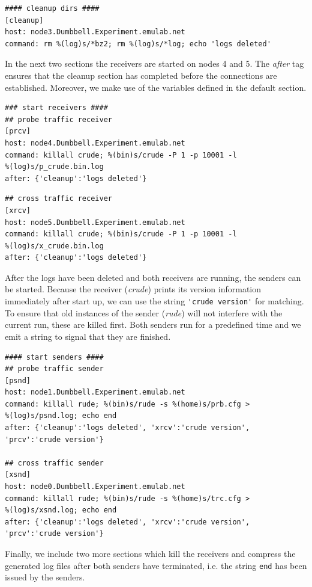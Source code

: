 \begin{Verbatim}[fontsize=\footnotesize]
#### cleanup dirs ####
[cleanup]
host: node3.Dumbbell.Experiment.emulab.net
command: rm %(log)s/*bz2; rm %(log)s/*log; echo 'logs deleted'
\end{Verbatim}

In the next two sections the receivers are started on nodes 4 and
5. The \emph{after} tag ensures that the cleanup section has completed
before the connections are established. Moreover, we make use of the
variables defined in the default section.

\begin{Verbatim}[fontsize=\footnotesize]
### start receivers ####
## probe traffic receiver
[prcv]
host: node4.Dumbbell.Experiment.emulab.net
command: killall crude; %(bin)s/crude -P 1 -p 10001 -l
%(log)s/p_crude.bin.log
after: {'cleanup':'logs deleted'}
\end{Verbatim}

\begin{Verbatim}[fontsize=\footnotesize]
## cross traffic receiver
[xrcv]
host: node5.Dumbbell.Experiment.emulab.net
command: killall crude; %(bin)s/crude -P 1 -p 10001 -l
%(log)s/x_crude.bin.log
after: {'cleanup':'logs deleted'}
\end{Verbatim}

After the logs have been deleted and both receivers are running, the
senders can be started. Because the receiver (\emph{crude}) prints its
version information immediately after start up, we can use the string
\Verb='crude version'= for matching. To ensure that old instances of
the sender (\emph{rude}) will not interfere with the current run,
these are killed first. Both senders run for a predefined time and we
emit a string to signal that they are finished.

\begin{Verbatim}[fontsize=\footnotesize]
#### start senders ####
## probe traffic sender
[psnd]
host: node1.Dumbbell.Experiment.emulab.net
command: killall rude; %(bin)s/rude -s %(home)s/prb.cfg >
%(log)s/psnd.log; echo end
after: {'cleanup':'logs deleted', 'xrcv':'crude version',
'prcv':'crude version'}

## cross traffic sender
[xsnd]
host: node0.Dumbbell.Experiment.emulab.net
command: killall rude; %(bin)s/rude -s %(home)s/trc.cfg >
%(log)s/xsnd.log; echo end
after: {'cleanup':'logs deleted', 'xrcv':'crude version',
'prcv':'crude version'}
\end{Verbatim}

Finally, we include two more sections which kill the receivers and
compress the generated log files after both senders have terminated,
i.e. the string \Verb=end= has been issued by the senders.


